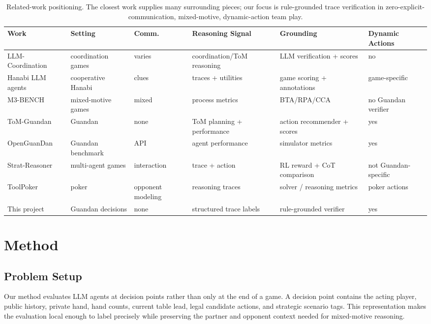 \documentclass[sigconf,anonymous,review]{acmart}
\begin{document}
\begin{table}[t]
\centering
\caption{Related-work positioning. The closest work supplies many surrounding pieces; our focus is rule-grounded trace verification in zero-explicit-communication, mixed-motive, dynamic-action team play.}
\label{tab:related}
\small
\begin{tabularx}{\textwidth}{lllllX}
\toprule
Work & Setting & Comm. & Reasoning Signal & Grounding & Dynamic Actions \\
\midrule
LLM-Coordination & coordination games & varies & coordination/ToM reasoning & LLM verification + scores & no \\
Hanabi LLM agents & cooperative Hanabi & clues & traces + utilities & game scoring + annotations & game-specific \\
M3-BENCH & mixed-motive games & mixed & process metrics & BTA/RPA/CCA & no Guandan verifier \\
ToM-Guandan & Guandan & none & ToM planning + performance & action recommender + scores & yes \\
OpenGuanDan & Guandan benchmark & API & agent performance & simulator metrics & yes \\
Strat-Reasoner & multi-agent games & interaction & trace + action & RL reward + CoT comparison & not Guandan-specific \\
ToolPoker & poker & opponent modeling & reasoning traces & solver / reasoning metrics & poker actions \\
This project & Guandan decisions & none & structured trace labels & rule-grounded verifier & yes \\
\bottomrule
\end{tabularx}
\end{table}

\section{Method}

\subsection{Problem Setup}

Our method evaluates LLM agents at decision points rather than only at the end of a game. A decision point contains the acting player, public history, private hand, hand counts, current table lead, legal candidate actions, and strategic scenario tags. This representation makes the evaluation local enough to label precisely while preserving the partner and opponent context needed for mixed-motive reasoning.
\end{document}
